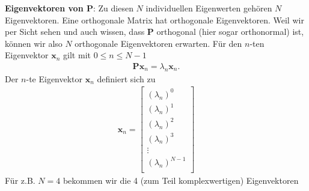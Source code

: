 \textbf{Eigenvektoren von $\bm{P}$}:
Zu diesen $N$ individuellen Eigenwerten gehören $N$ Eigenvektoren. Eine orthogonale
Matrix hat orthogonale Eigenvektoren. Weil wir per Sicht sehen und auch wissen,
dass $\bm{P}$ orthogonal (hier sogar orthonormal) ist,
können wir also $N$ orthogonale
Eigenvektoren erwarten.
Für den $n$-ten Eigenvektor $\bm{x}_n$ gilt mit $0\leq n \leq N-1$
\begin{align}
\bm{P} \bm{x}_n = \lambda_n \bm{x}_n.
\end{align}
Der $n$-te Eigenvektor $\bm{x}_n$ definiert sich zu
\begin{align}
\bm{x}_n =
\begin{bmatrix}
(\lambda_n)^0\\
(\lambda_n)^1\\
(\lambda_n)^2\\
(\lambda_n)^3\\
\vdots\\
(\lambda_n)^{N-1}\\
\end{bmatrix}
\end{align}
%
Für z.B. $N=4$ bekommen wir die 4 (zum Teil komplexwertigen) Eigenvektoren
